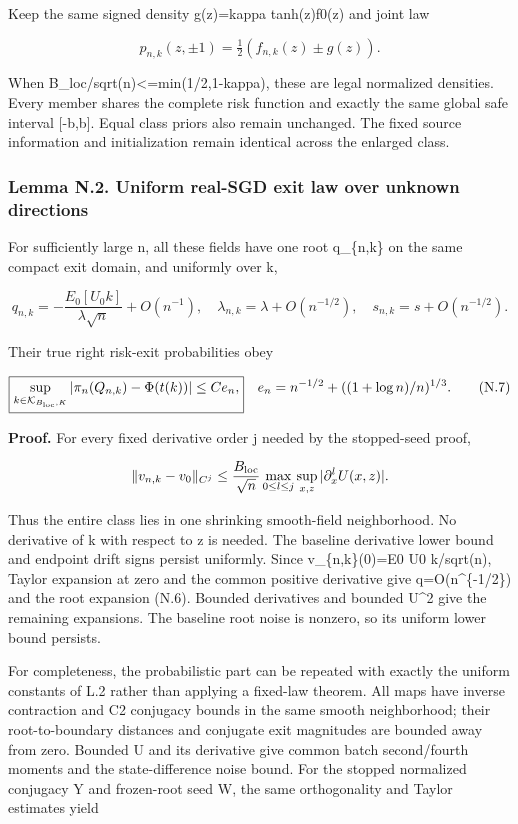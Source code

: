 Keep the same signed density g(z)=kappa tanh(z)f0(z) and joint law

\[
p_{n,k}(z,\pm1)=\tfrac12(f_{n,k}(z)\pm g(z)).
\]

When B\_loc/sqrt(n)\textless=min(1/2,1-kappa), these are legal
normalized densities. Every member shares the complete risk function and
exactly the same global safe interval {[}-b,b{]}. Equal class priors
also remain unchanged. The fixed source information and initialization
remain identical across the enlarged class.

\subsubsection{Lemma N.2. Uniform real-SGD exit law over unknown
directions}\label{lemma-n.2.-uniform-real-sgd-exit-law-over-unknown-directions}

For sufficiently large n, all these fields have one root q\_\{n,k\} on
the same compact exit domain, and uniformly over k,

\[
q_{n,k}=-\frac{E_0[U_0 k]}{\lambda\sqrt n}+O(n^{-1}),
\quad \lambda_{n,k}=\lambda+O(n^{-1/2}),
\quad s_{n,k}=s+O(n^{-1/2}).
\tag{N.6}
\]

Their true right risk-exit probabilities obey

\[
\boxed{\sup_{k\in\mathcal K_{B_{\rm loc},K}}
|\pi_n(Q_{n,k})-\Phi(t(k))|\le C e_n,}
\quad e_n=n^{-1/2}+((1+\log n)/n)^{1/3}.
\tag{N.7}
\]

\textbf{Proof.} For every fixed derivative order j needed by the
stopped-seed proof,

\[
\|v_{n,k}-v_0\|_{C^j}
\le \frac{B_{\rm loc}}{\sqrt n}
\max_{0\le l\le j}\sup_{x,z}|\partial_x^lU(x,z)|.
\]

Thus the entire class lies in one shrinking smooth-field neighborhood.
No derivative of k with respect to z is needed. The baseline derivative
lower bound and endpoint drift signs persist uniformly. Since
v\_\{n,k\}(0)=E0 U0 k/sqrt(n), Taylor expansion at zero and the common
positive derivative give q=O(n\^{}\{-1/2\}) and the root expansion
(N.6). Bounded derivatives and bounded U\^{}2 give the remaining
expansions. The baseline root noise is nonzero, so its uniform lower
bound persists.

For completeness, the probabilistic part can be repeated with exactly
the uniform constants of L.2 rather than applying a fixed-law theorem.
All maps have inverse contraction and C2 conjugacy bounds in the same
smooth neighborhood; their root-to-boundary distances and conjugate exit
magnitudes are bounded away from zero. Bounded U and its derivative give
common batch second/fourth moments and the state-difference noise bound.
For the stopped normalized conjugacy Y and frozen-root seed W, the same
orthogonality and Taylor estimates yield

